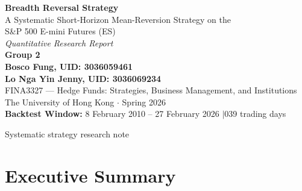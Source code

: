\documentclass[11pt]{article}
\begin{document}
\thispagestyle{empty}
\begin{center}
\vspace*{1.5cm}
{\color{navy}\Huge\bfseries Breadth Reversal Strategy}\\[0.6em]
{\large A Systematic Short-Horizon Mean-Reversion Strategy on the\\
 S\&P 500 E-mini Futures (ES)}\\[1.5em]

{\large\itshape Quantitative Research Report}\\[4em]

{\Large\bfseries Group 2}\\[0.6em]
{\Large\bfseries Bosco Fung, UID: 3036059461\\[0.3em]
Lo Nga Yin Jenny, UID: 3036069234}\\[0.5em]
FINA3327 --- Hedge Funds: Strategies, Business Management, and Institutions\\[0.3em]
The University of Hong Kong $\cdot$ Spring 2026\\[3em]

\textbf{Backtest Window:} 8 February 2010 -- 27 February 2026 \quad$|$039 trading days\\[4em]

\end{center}

\vfill
\begin{center}\footnotesize Systematic strategy research note\end{center}

\newpage

\tableofcontents
\newpage

\section{Executive Summary}
\end{document}

